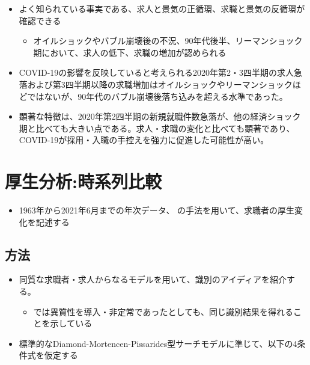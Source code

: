 \documentclass[
]{book}
\providecommand{\tightlist}{%
  \setlength{\itemsep}{0pt}\setlength{\parskip}{0pt}}
\begin{document}
\begin{itemize}
\item
  よく知られている事実である、求人と景気の正循環、求職と景気の反循環が確認できる

  \begin{itemize}
  \tightlist
  \item
    オイルショックやバブル崩壊後の不況、90年代後半、リーマンショック期において、求人の低下、求職の増加が認められる
  \end{itemize}
\item
  COVID-19の影響を反映していると考えられる2020年第2・3四半期の求人急落および第3四半期以降の求職増加はオイルショックやリーマンショックほどではないが、90年代のバブル崩壊後落ち込みを超える水準であった。
\item
  顕著な特徴は、2020年第2四半期の新規就職件数急落が、他の経済ショック期と比べても大きい点である。求人・求職の変化と比べても顕著であり、COVID-19が採用・入職の手控えを強力に促進した可能性が高い。
\end{itemize}

\hypertarget{ux539aux751fux5206ux6790ux6642ux7cfbux5217ux6bd4ux8f03}{%
\chapter{厚生分析:時系列比較}\label{ux539aux751fux5206ux6790ux6642ux7cfbux5217ux6bd4ux8f03}}

\begin{itemize}
\tightlist
\item
  1963年から2021年6月までの年次データ、\citet{kawata2021first} の手法を用いて、求職者の厚生変化を記述する
\end{itemize}

\hypertarget{ux65b9ux6cd5-1}{%
\section{方法}\label{ux65b9ux6cd5-1}}

\begin{itemize}
\item
  同質な求職者・求人からなるモデルを用いて、識別のアイディアを紹介する。

  \begin{itemize}
  \tightlist
  \item
    \citet{kawata2021first} では異質性を導入・非定常であったとしても、同じ識別結果を得れることを示している
  \end{itemize}
\item
  標準的なDiamond-Mortencen-Pissarides型サーチモデル\citep{rogerson2005search}に準じて、以下の4条件式を仮定する
\end{itemize}
\end{document}
